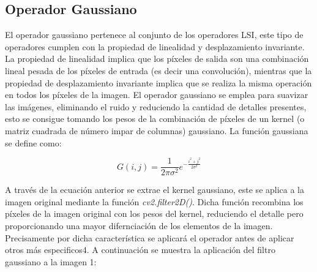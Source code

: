 \documentclass[a4paper,12pt]{article}
\begin{document}
{\vspace{0.5cm}

\subsection{Operador Gaussiano}

\vspace{0.5cm}

El operador gaussiano pertenece al conjunto de los operadores LSI, este tipo de operadores cumplen con la propiedad de linealidad y desplazamiento invariante. La propiedad de
linealidad implica que los píxeles de salida son una combinación lineal pesada de los píxeles de entrada (es decir una convolución), mientras que la propiedad de desplazamiento invariante 
implica que se realiza la misma operación en todos los píxeles de la imagen. El operador gaussiano se emplea para suavizar las imágenes, eliminando el ruido y reduciendo la 
cantidad de detalles presentes, esto se consigue tomando los pesos de la combinación de píxeles de un kernel (o matriz cuadrada de número impar de columnas) gaussiano. 
La función gaussiana se define como:

\vspace{0.5cm}

\begin{equation}
  G(i, j) = \frac{1}{2\pi\sigma^2}e^{-\frac{i^2 + j^2}{2\sigma^2}}
\end{equation}

\vspace{0.5cm}

A través de la ecuación anterior se extrae el kernel gaussiano, este se aplica a la imagen original mediante la función \textit{cv2.filter2D()}. Dicha función recombina los 
píxeles de la imagen original con los pesos del kernel, reduciendo el detalle pero proporcionando una mayor difernciación de los elementos de la imagen. Precisamente por dicha 
característica se aplicará el operador antes de aplicar otros más especificos4. A continuación se muestra la aplicación del filtro gaussiano a la imagen 1: 

\vspace{0.5cm}

\begin{figure}[H]


\end{figure}}
\end{document}

